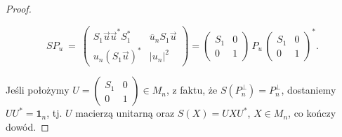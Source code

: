 \begin{proof}
\begin{linenomath*}
 \begin{equation}
 SP_{u} \:=\:
 \begin{pmatrix}
      S_{1} \vec{u} \vec{u}^{*} S_{1}^{*}  &
         \overline{u}_{n} S_{1} \vec{u} \\
    u_{n} ( S_{1} \vec{u} )^{*} &
        |u_{n}|^{2}
 \end{pmatrix} =
    \begin{pmatrix}
    S_{1} & 0 \\ 0 & 1
    \end{pmatrix}
    \, P_{u} \,
    \begin{pmatrix}
    S_{1} & 0 \\ 0 & 1
    \end{pmatrix}^{*}.
 \end{equation}
\end{linenomath*}
Jeśli położymy $U = \left( \begin{smallmatrix} S_{1} & 0 \\ 0 & 1
\end{smallmatrix} \right) \in M_{n}$,
z faktu, że $S(P_{n}^{\perp}) = P_{n}^{\perp}$,
dostaniemy $U U^{*} = \mathbf{1}_{n}$, tj. $U$ macierzą unitarną oraz
$S(X) = U X U^{*}$, $X \in M_{n}$, co kończy dowód.
\end{proof}

